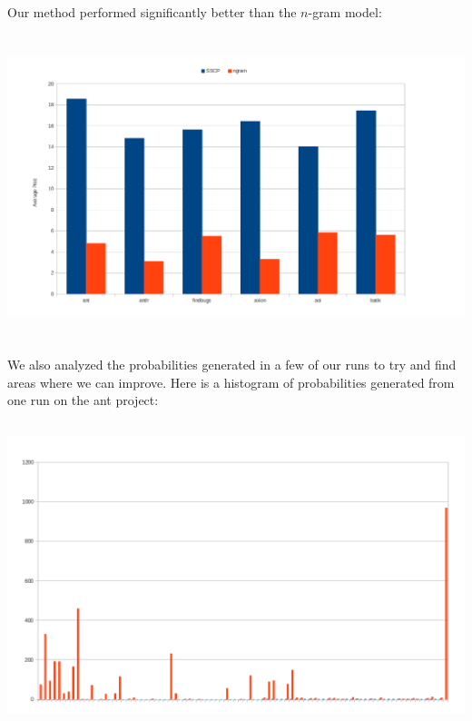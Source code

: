 \documentclass{article} %
\begin{document}
Our method performed significantly better than the $n$-gram model:\\
\begin{centering}
\includegraphics[width=40em, height=24em]{overall.png}
\end{centering}

We also analyzed the probabilities generated in a few of our runs to try and find areas where we can improve. Here is a histogram of probabilities generated from one run on the ant project:\\
\begin{centering}
\includegraphics[width=40em, height=24em]{ant.png}
\end{centering}
\end{document}
